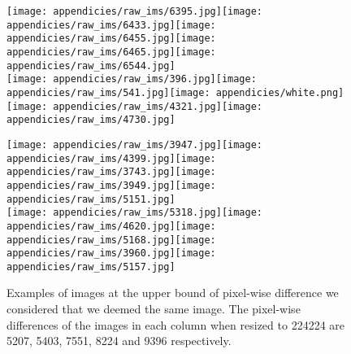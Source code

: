 \documentclass[letterpaper, 11pt]{IEEEtran}
\begin{document}
\begin{figure*}[!ht]   
    \centering
    \fontsize{9}{9}\selectfont
    \texttt{[image: appendicies/raw\_ims/6395.jpg]}\texttt{[image: appendicies/raw\_ims/6433.jpg]}\texttt{[image: appendicies/raw\_ims/6455.jpg]}\texttt{[image: appendicies/raw\_ims/6465.jpg]}\texttt{[image: appendicies/raw\_ims/6544.jpg]}\\
\vspace{-0.15em}
\texttt{[image: appendicies/raw\_ims/396.jpg]}\texttt{[image: appendicies/raw\_ims/541.jpg]}\texttt{[image: appendicies/white.png]}\texttt{[image: appendicies/raw\_ims/4321.jpg]}\texttt{[image: appendicies/raw\_ims/4730.jpg]}%
    \label{no_similar}
\end{figure*}
\begin{figure*}[!ht]
    \centering
    \fontsize{9}{9}\selectfont
    \texttt{[image: appendicies/raw\_ims/3947.jpg]}\texttt{[image: appendicies/raw\_ims/4399.jpg]}\texttt{[image: appendicies/raw\_ims/3743.jpg]}\texttt{[image: appendicies/raw\_ims/3949.jpg]}\texttt{[image: appendicies/raw\_ims/5151.jpg]}\\
\vspace{-0.0999em}
\texttt{[image: appendicies/raw\_ims/5318.jpg]}\texttt{[image: appendicies/raw\_ims/4620.jpg]}\texttt{[image: appendicies/raw\_ims/5168.jpg]}\texttt{[image: appendicies/raw\_ims/3960.jpg]}\texttt{[image: appendicies/raw\_ims/5157.jpg]}\\
     \caption{Examples of images at the upper bound of pixel-wise difference we considered that we deemed the same image. The pixel-wise differences of the images in each column when resized to 224224 are 5207, 5403, 7551, 8224 and 9396 respectively.}
    \label{similar}
\end{figure*}
\end{document}
